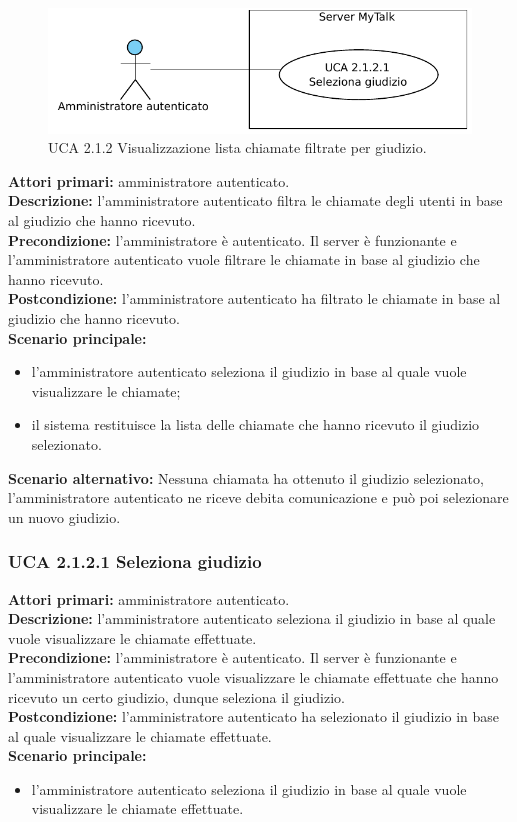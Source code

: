 \begin{figure}[htbp]
\centering
\includegraphics[scale=0.7]{./casi_uso/UCA2-1-2.pdf}
\caption{UCA 2.1.2 Visualizzazione lista chiamate filtrate per giudizio.}
\end{figure}

\noindent
\textbf{Attori primari:} amministratore autenticato.\\
\textbf{Descrizione:} l'amministratore autenticato filtra le chiamate degli utenti in base al giudizio che hanno ricevuto.\\
\textbf{Precondizione:} l'amministratore è autenticato. Il server è funzionante e l'amministratore autenticato vuole filtrare le chiamate in base al giudizio che hanno ricevuto.\\
\textbf{Postcondizione:} l'amministratore autenticato ha filtrato le chiamate in base al giudizio che hanno ricevuto.\\
\textbf{Scenario principale:}
\begin{itemize}
\item l'amministratore autenticato seleziona il giudizio in base al quale vuole visualizzare le chiamate;
\item il sistema restituisce la lista delle chiamate che hanno ricevuto il giudizio selezionato.
\end{itemize}
\textbf{Scenario alternativo:} Nessuna chiamata ha ottenuto il giudizio selezionato, l'amministratore autenticato ne riceve debita comunicazione e può poi selezionare un nuovo giudizio.\\

\subsubsection{UCA 2.1.2.1 Seleziona giudizio}
\noindent
\textbf{Attori primari:} amministratore autenticato.\\
\textbf{Descrizione:} l'amministratore autenticato seleziona il giudizio in base al quale vuole visualizzare le chiamate effettuate.\\
\textbf{Precondizione:} l'amministratore è autenticato. Il server è funzionante e l'amministratore autenticato vuole visualizzare le chiamate effettuate che hanno ricevuto un certo giudizio, dunque seleziona il giudizio.\\
\textbf{Postcondizione:} l'amministratore autenticato ha selezionato il giudizio in base al quale visualizzare le chiamate effettuate.\\
\textbf{Scenario principale:}
\begin{itemize}
\item l'amministratore autenticato seleziona il giudizio in base al quale vuole visualizzare le chiamate effettuate.
\end{itemize}

